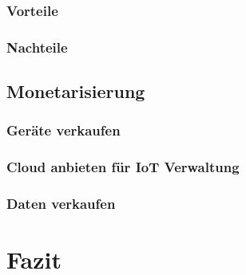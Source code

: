 
\subsubsection{Vorteile}
\subsubsection{Nachteile}


\subsection{Monetarisierung}

\subsubsection{Geräte verkaufen} %

\subsubsection{Cloud anbieten für IoT Verwaltung} %

\subsubsection{Daten verkaufen}%

\section{Fazit}


